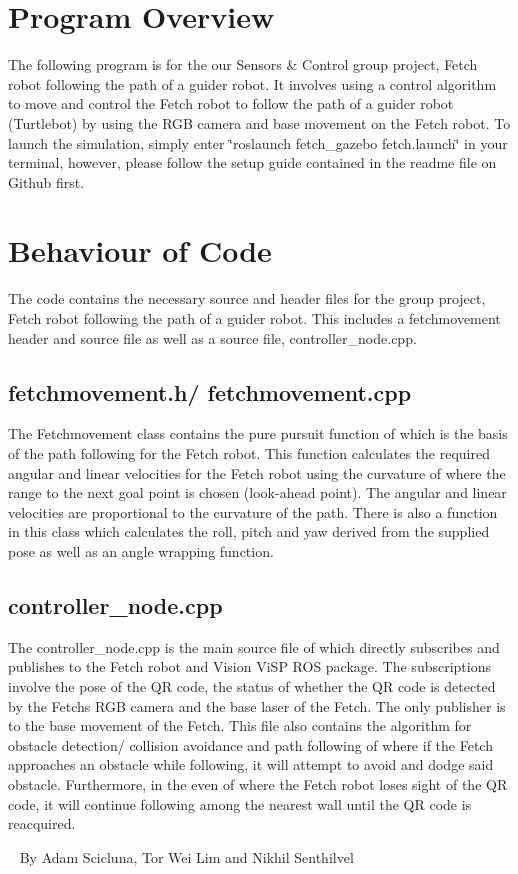 \hypertarget{index_ac_doc_index_more_info}{}\section{Program Overview}\label{index_ac_doc_index_more_info}
The following program is for the our Sensors \& Control group project, Fetch robot following the path of a guider robot. It involves using a control algorithm to move and control the Fetch robot to follow the path of a guider robot (Turtlebot) by using the R\+GB camera and base movement on the Fetch robot. To launch the simulation, simply enter \char`\"{}roslaunch fetch\+\_\+gazebo fetch.\+launch\char`\"{} in your terminal, however, please follow the setup guide contained in the readme file on Github first.\hypertarget{index_ac_doc_code_behaviour}{}\section{Behaviour of Code}\label{index_ac_doc_code_behaviour}
The code contains the necessary source and header files for the group project, Fetch robot following the path of a guider robot. This includes a \textquotesingle{}fetchmovement\textquotesingle{} header and source file as well as a source file, controller\+\_\+node.\+cpp.\hypertarget{index_ac_doc_data_fetch}{}\subsection{fetchmovement.\+h/ fetchmovement.\+cpp}\label{index_ac_doc_data_fetch}
The Fetchmovement class contains the pure pursuit function of which is the basis of the path following for the Fetch robot. This function calculates the required angular and linear velocities for the Fetch robot using the curvature of where the range to the next goal point is chosen (look-\/ahead point). The angular and linear velocities are proportional to the curvature of the path. There is also a function in this class which calculates the roll, pitch and yaw derived from the supplied pose as well as an angle wrapping function.\hypertarget{index_ac_doc_data_control}{}\subsection{controller\+\_\+node.\+cpp}\label{index_ac_doc_data_control}
The controller\+\_\+node.\+cpp is the main source file of which directly subscribes and publishes to the Fetch robot and Vision Vi\+SP R\+OS package. The subscriptions involve the pose of the QR code, the status of whether the QR code is detected by the Fetch\textquotesingle{}s R\+GB camera and the base laser of the Fetch. The only publisher is to the base movement of the Fetch. This file also contains the algorithm for obstacle detection/ collision avoidance and path following of where if the Fetch approaches an obstacle while following, it will attempt to avoid and dodge said obstacle. Furthermore, in the even of where the Fetch robot loses sight of the QR code, it will continue following among the nearest wall until the QR code is reacquired.

~\newline
 By Adam Scicluna, Tor Wei Lim and Nikhil Senthilvel 